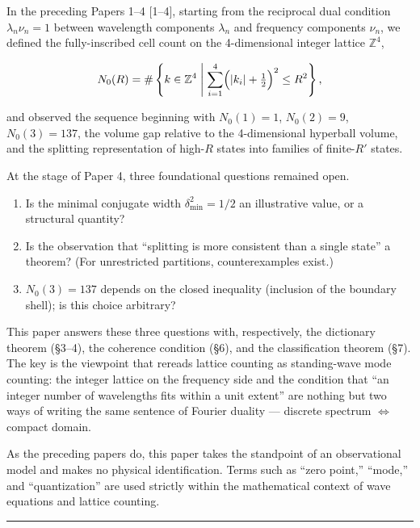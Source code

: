 \documentclass[
]{article}
\providecommand{\tightlist}{%
  \setlength{\itemsep}{0pt}\setlength{\parskip}{0pt}}
\begin{document}
In the preceding Papers 1--4 {[}1--4{]}, starting from the reciprocal
dual condition \(\lambda_n\nu_n=1\) between wavelength components
\(\lambda_n\) and frequency components \(\nu_n\), we defined the
fully-inscribed cell count on the 4-dimensional integer lattice
\(\mathbb{Z}^4\),

\[
N_0(R)=\#\left\{k\in\mathbb{Z}^4\;\middle|\;\sum_{i=1}^4\Bigl(|k_i|+\tfrac12\Bigr)^2\le R^2\right\},
\]

and observed the sequence beginning with \(N_0(1)=1\), \(N_0(2)=9\),
\(N_0(3)=137\), the volume gap relative to the 4-dimensional hyperball
volume, and the splitting representation of high-\(R\) states into
families of finite-\(R'\) states.

At the stage of Paper 4, three foundational questions remained open.

\begin{enumerate}
\def\labelenumi{\arabic{enumi}.}
\tightlist
\item
  Is the minimal conjugate width \(\delta_{\min}^2=1/2\) an illustrative
  value, or a structural quantity?
\item
  Is the observation that ``splitting is more consistent than a single
  state'' a theorem? (For unrestricted partitions, counterexamples
  exist.)
\item
  \(N_0(3)=137\) depends on the closed inequality (inclusion of the
  boundary shell); is this choice arbitrary?
\end{enumerate}

This paper answers these three questions with, respectively, the
dictionary theorem (§3--4), the coherence condition (§6), and the
classification theorem (§7). The key is the viewpoint that rereads
lattice counting as standing-wave mode counting: the integer lattice on
the frequency side and the condition that ``an integer number of
wavelengths fits within a unit extent'' are nothing but two ways of
writing the same sentence of Fourier duality --- discrete spectrum
\(\Leftrightarrow\) compact domain.

As the preceding papers do, this paper takes the standpoint of an
observational model and makes no physical identification. Terms such as
``zero point,'' ``mode,'' and ``quantization'' are used strictly within
the mathematical context of wave equations and lattice counting.

\begin{center}\rule{0.5\linewidth}{0.5pt}\end{center}
\end{document}

